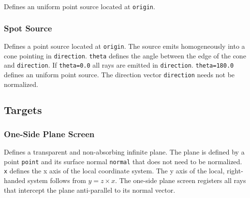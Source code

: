 \documentclass[10pt,a4paper,titlepage]{article}
\begin{document}
Defines an uniform point source located at {\tt origin}. 


\subsubsection{Spot Source}









Defines a point source located at {\tt origin}. The source emits homogeneously into a cone pointing in {\tt direction}. {\tt theta} defines the angle between the edge of the cone and {\tt direction}. If {\tt theta=0.0} all rays are emitted in {\tt direction}. {\tt theta=180.0} defines an uniform point source. The direction vector {\tt direction} needs not be normalized.


\subsection{Targets}

\subsubsection{One-Side Plane Screen}






Defines a transparent and non-absorbing infinite plane. The plane is defined by a point {\tt point} and its surface normal {\tt normal} that does not need to be normalized. {\tt x} defines the x axis of the local coordinate system. The y axis of the local, right-handed system follows from $y=z \times x$. The one-side plane screen registers all rays that intercept the plane anti-parallel to its normal vector.
\end{document}
